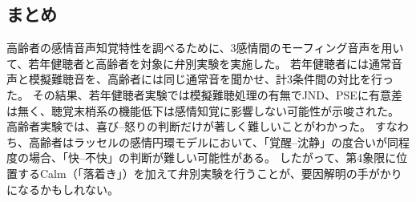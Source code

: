 


\subsection{まとめ}
高齢者の感情音声知覚特性を調べるために、3感情間のモーフィング音声を用いて、若年健聴者と高齢者を対象に弁別実験を実施した。
若年健聴者には通常音声と模擬難聴音を、高齢者には同じ通常音を聞かせ、計3条件間の対比を行った。
その結果、若年健聴者実験では模擬難聴処理の有無でJND、PSEに有意差は無く、聴覚末梢系の機能低下は感情知覚に影響しない可能性が示唆された。
高齢者実験では、喜び--怒りの判断だけが著しく難しいことがわかった。
すなわち、高齢者はラッセルの感情円環モデルにおいて、「覚醒--沈静」の度合いが同程度の場合、「快--不快」の判断が難しい可能性がある。
したがって、第4象限に位置するCalm（「落着き」）を加えて弁別実験を行うことが、要因解明の手がかりになるかもしれない。

